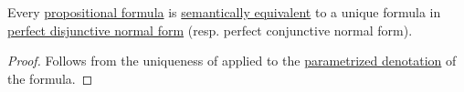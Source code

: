 \begin{proposition}\label{thm:full_cnf_and_dnf_uniqueness}
  Every \hyperref[def:propositional_formula]{propositional formula} is \hyperref[def:propositional_semantics/equivalence]{semantically equivalent} to a unique formula in \hyperref[def:full_propositional_cnf_and_dnf]{perfect disjunctive normal form} (resp. perfect conjunctive normal form).
\end{proposition}
\begin{proof}
  Follows from the uniqueness of  applied to the \hyperref[def:parametrized_propositional_denotation]{parametrized denotation} of the formula.
\end{proof}
